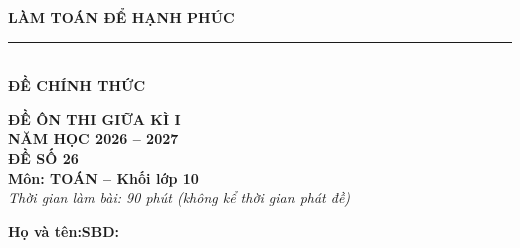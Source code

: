 \documentclass[12pt,a4paper]{article}
\begin{document}
\noindent
\begin{minipage}[c]{0.38\textwidth}
    \centering
    \textbf{LÀM TOÁN ĐỂ HẠNH PHÚC}\\[-2pt]
    \rule{3.2cm}{0.6pt}\\[3pt]
    \textbf{ĐỀ CHÍNH THỨC}
\end{minipage}\hfill
\begin{minipage}[c]{0.35\textwidth}
    \centering
    \textbf{ĐỀ ÔN THI GIỮA KÌ I}\\
    \textbf{NĂM HỌC 2026 -- 2027}\\[2pt]
    \textbf{ĐỀ SỐ 26}\\
    \textbf{Môn: TOÁN -- Khối lớp 10}\\
    \textit{\small Thời gian làm bài: 90 phút (không kể thời gian phát đề)}
\end{minipage}

\vspace{0.03cm}
\noindent
\begin{minipage}[b]{0.78\textwidth}
    \textbf{Họ và tên:}\dotfill\textbf{SBD:}\makebox[3.5cm]{\dotfill}
\end{minipage}\hfill
\begin{minipage}[b]{0.20\textwidth}
    \hfill
    \setlength{\fboxrule}{0.8pt}%
\end{minipage}
\vspace{0.03cm}
\end{document}
